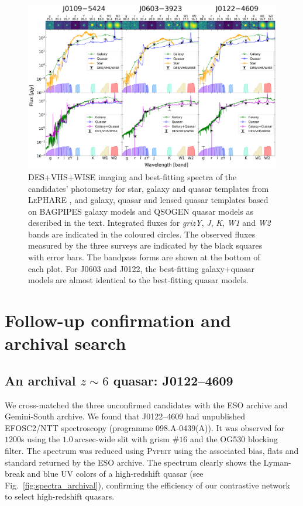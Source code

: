 \documentclass[fleqn,usenatbib]{mnras}
\begin{document}
\begin{figure}
\includegraphics[width=\textwidth]{figs/seds.pdf}
\caption{
DES+VHS+WISE imaging and best-fitting spectra of the candidates' photometry for star, galaxy and quasar templates from \textsc{LePHARE} \citep{lephare}, and galaxy, quasar and lensed quasar templates based on \textsc{BAGPIPES} galaxy models \citep{carnall18} and \textsc{QSOGEN} quasar models \citep{temple22} as described in the text.
Integrated fluxes for \textit{grizY}, \textit{J}, \textit{K}, \textit{W1} and \textit{W2} bands are indicated in the coloured circles.
The observed fluxes measured by the three surveys are indicated by the black squares with error bars.
The bandpass forms are shown at the bottom of each plot.
For J0603 and J0122, the best-fitting galaxy+quasar models are almost identical to the best-fitting quasar models.
}
\label{fig:fits}
\end{figure}

\section{Follow-up confirmation and archival search} \label{confirmation}

\subsection{An archival \texorpdfstring{$z\sim 6$}{TEXT} quasar: J0122--4609}
\label{archival}
We cross-matched the three unconfirmed candidates with the ESO archive and Gemini-South archive. We found that J0122--4609 had unpublished EFOSC2/NTT spectroscopy (programme 098.A-0439(A)).
It was observed for $1200$s using the $1.0\,\text{arcsec}$-wide slit with grism $\#16$ and the OG530 blocking filter. The spectrum was reduced using \textsc{Pypeit} \citep{pypeit:joss_pub} using the associated bias, flats and standard returned by the ESO archive.
The spectrum clearly shows the Lyman-break and blue UV colors of a high-redshift quasar (see Fig.~\ref{fig:spectra_archival}), confirming the efficiency of our contrastive network to select high-redshift quasars.
\end{document}
